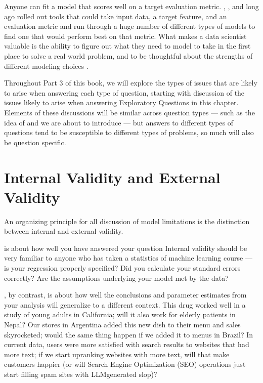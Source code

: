 \documentclass[letterpaper,10pt,english]{jupyterBook}
\begin{document}
\sphinxAtStartPar
Anyone can fit a model that scores well on a target evaluation metric. , , and  long ago rolled out tools that could take input data, a target feature, and an evaluation metric and run through a huge number of different types of models to find one that would perform best on that metric. What makes a data scientist valuable is the ability to figure out what they need to model to take in the first place to solve a real world problem, and to be thoughtful about the strengths  of different modeling choices .

\sphinxAtStartPar
Throughout Part 3 of this book, we will explore the types of issues that are likely to arise when answering each type of question, starting with discussion of the issues likely to arise when answering Exploratory Questions in this chapter. Elements of these discussions will be similar across question types — such as the idea of  and  we are about to introduce — but answers to different types of questions tend to be susceptible to different types of problems, so much will also be question specific.


\section{Internal Validity and External Validity}
\label{\detokenize{30_questions/15_answering_exploratory_questions:internal-validity-and-external-validity}}
\sphinxAtStartPar
An organizing principle for all discussion of model limitations is the distinction between internal and external validity.

\sphinxAtStartPar
{} is about how well you have answered your question  Internal validity should be very familiar to anyone who has taken a statistics of machine learning course — is your regression properly specified? Did you calculate your standard errors correctly? Are the assumptions underlying your model met by the data?

\sphinxAtStartPar
{}, by contrast, is about how well the conclusions and parameter estimates from your analysis will generalize to a different context. This drug worked well in a study of young adults in California; will it also work for elderly patients in Nepal? Our stores in Argentina added this new dish to their menu and sales skyrocketed; would the same thing happen if we added it to menus in Brazil? In current data, users were more satisfied with search results to websites that had more text; if we start up\sphinxhyphen{}ranking websites with more text, will that make customers happier (or will Search Engine Optimization (SEO) operations just start filling spam sites with LLM\sphinxhyphen{}generated slop)?
\end{document}
